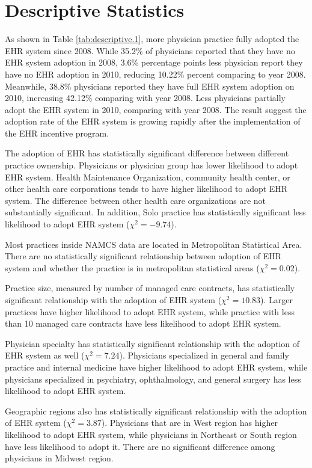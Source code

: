 \section{Descriptive Statistics}

As shown in Table \ref{tab:descriptive.1}, more physician practice fully adopted the EHR system since 2008. While 35.2\% of physicians reported that they have no EHR system adoption in 2008, 3.6\% percentage points less physician report they have no EHR adoption in 2010, reducing 10.22\% percent comparing to year 2008. Meanwhile, 38.8\% physicians reported they have full EHR system adoption on 2010, increasing 42.12\% comparing with year 2008. Less physicians partially adopt the EHR system in 2010, comparing with year 2008. The result suggest the adoption rate of the EHR system is growing rapidly after the implementation of the EHR incentive program.

The adoption of EHR has statistically significant difference between different practice ownership. Physicians or physician group has lower likelihood to adopt EHR system. Health Maintenance Organization, community health center, or other health care corporations tends to have higher likelihood to adopt EHR system. The difference between other health care organizations are not substantially significant. In addition, Solo practice has statistically significant less likelihood to adopt EHR system ($\chi^2=-9.74$).

Most practices inside NAMCS data are located in Metropolitan Statistical Area. There are no statistically significant relationship between adoption of EHR system and whether the practice is in metropolitan statistical areas ($\chi^2=0.02$).

Practice size, measured by number of managed care contracts, has statistically significant relationship with the adoption of EHR system ($\chi^2=10.83$). Larger practices have higher likelihood to adopt EHR system, while practice with less than 10 managed care contracts have less likelihood to adopt EHR system.

Physician specialty has statistically significant relationship with the adoption of EHR system as well ($\chi^2=7.24$). Physicians specialized in general and family practice and internal medicine have higher likelihood to adopt EHR system, while physicians specialized in psychiatry, ophthalmology, and general surgery has less likelihood to adopt EHR system.

Geographic regions also has statistically significant relationship with the adoption of EHR system ($\chi^2=3.87$). Physicians that are in West region has higher likelihood to adopt EHR system, while physicians in Northeast or South region have less likelihood to adopt it. There are no significant difference among physicians in Midwest region.
